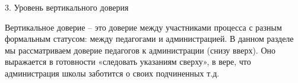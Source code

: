 \begin{frame}{3. Уровень вертикального доверия}

\tiny

Вертикальное доверие – это доверие между участниками процесса с разным формальным статусом: между педагогами и администрацией.
В данном разделе мы рассматриваем доверие педагогов к администрации (снизу вверх). 
Оно выражается в готовности «следовать указаниям сверху», в вере, что администрация 
школы заботится о своих подчиненных т.д. 
\end{frame}


